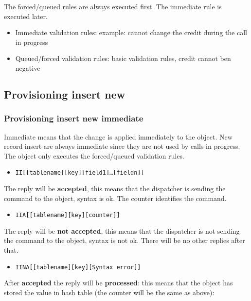 \documentclass[a4paper]{article}
\begin{document}
The forced/queued rules are always executed first. The immediate rule is
executed later.

\begin{itemize}
   \item Immediate validation rules: example: cannot change the credit during
   the call in progress
   \item Queued/forced validation rules: basic validation rules, credit cannot
   ben negative
\end{itemize}




\subsection{Provisioning insert new}
\subsubsection{Provisioning insert new immediate}

Immediate means that the change is applied immediately to the object. New record
insert are always immediate since they are not used by calls in progress.
The object only executes the forced/queued validation rules.

\begin{itemize}
	\item {\tt II[[tablename][key][field1]\ldots[fieldn]]}
\end{itemize}


The reply will be {\bf accepted}, this means that the dispatcher is sending the
command to the object, syntax is ok. The counter identifies the command.

\begin{itemize}
	\item {\tt IIA[[tablename][key][counter]]}
\end{itemize}

The reply will be {\bf not accepted}, this means that the dispatcher is not
sending the command to the object, syntax is not ok. There will be no other
replies after that.

\begin{itemize}
	\item {\tt IINA[[tablename][key][Syntax error]]}
\end{itemize}


After {\bf accepted} the reply will be {\bf processed}: this means that the
object has stored the value in hash table (the counter will be the same as above):
\end{document}
